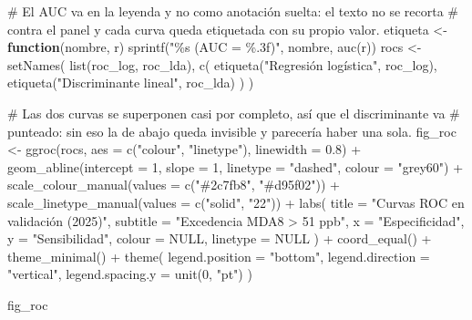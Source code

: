 \documentclass[
  spanish,
  letterpaper,
  DIV=11,
  numbers=noendperiod]{scrartcl}
\newenvironment{Shaded}{\begin{snugshade}}{\end{snugshade}}
\newcommand{\AttributeTok}[1]{\textcolor[rgb]{0.40,0.45,0.13}{#1}}
\newcommand{\CommentTok}[1]{\textcolor[rgb]{0.37,0.37,0.37}{#1}}
\newcommand{\ConstantTok}[1]{\textcolor[rgb]{0.56,0.35,0.01}{#1}}
\newcommand{\ControlFlowTok}[1]{\textcolor[rgb]{0.00,0.23,0.31}{\textbf{#1}}}
\newcommand{\DecValTok}[1]{\textcolor[rgb]{0.68,0.00,0.00}{#1}}
\newcommand{\FloatTok}[1]{\textcolor[rgb]{0.68,0.00,0.00}{#1}}
\newcommand{\FunctionTok}[1]{\textcolor[rgb]{0.28,0.35,0.67}{#1}}
\newcommand{\NormalTok}[1]{\textcolor[rgb]{0.00,0.23,0.31}{#1}}
\newcommand{\OtherTok}[1]{\textcolor[rgb]{0.00,0.23,0.31}{#1}}
\newcommand{\SpecialCharTok}[1]{\textcolor[rgb]{0.37,0.37,0.37}{#1}}
\newcommand{\StringTok}[1]{\textcolor[rgb]{0.13,0.47,0.30}{#1}}
\begin{document}
\begin{Shaded}
\begin{Highlighting}[]
\CommentTok{\# El AUC va en la leyenda y no como anotación suelta: el texto no se recorta}
\CommentTok{\# contra el panel y cada curva queda etiquetada con su propio valor.}
\NormalTok{etiqueta }\OtherTok{\textless{}{-}} \ControlFlowTok{function}\NormalTok{(nombre, r) }\FunctionTok{sprintf}\NormalTok{(}\StringTok{"\%s (AUC = \%.3f)"}\NormalTok{, nombre, }\FunctionTok{auc}\NormalTok{(r))}
\NormalTok{rocs }\OtherTok{\textless{}{-}} \FunctionTok{setNames}\NormalTok{(}
    \FunctionTok{list}\NormalTok{(roc\_log, roc\_lda),}
    \FunctionTok{c}\NormalTok{(}
        \FunctionTok{etiqueta}\NormalTok{(}\StringTok{"Regresión logística"}\NormalTok{, roc\_log),}
        \FunctionTok{etiqueta}\NormalTok{(}\StringTok{"Discriminante lineal"}\NormalTok{, roc\_lda)}
\NormalTok{    )}
\NormalTok{)}

\CommentTok{\# Las dos curvas se superponen casi por completo, así que el discriminante va}
\CommentTok{\# punteado: sin eso la de abajo queda invisible y parecería haber una sola.}
\NormalTok{fig\_roc }\OtherTok{\textless{}{-}} \FunctionTok{ggroc}\NormalTok{(rocs, }\AttributeTok{aes =} \FunctionTok{c}\NormalTok{(}\StringTok{"colour"}\NormalTok{, }\StringTok{"linetype"}\NormalTok{), }\AttributeTok{linewidth =} \FloatTok{0.8}\NormalTok{) }\SpecialCharTok{+}
    \FunctionTok{geom\_abline}\NormalTok{(}\AttributeTok{intercept =} \DecValTok{1}\NormalTok{, }\AttributeTok{slope =} \DecValTok{1}\NormalTok{, }\AttributeTok{linetype =} \StringTok{"dashed"}\NormalTok{, }\AttributeTok{colour =} \StringTok{"grey60"}\NormalTok{) }\SpecialCharTok{+}
    \FunctionTok{scale\_colour\_manual}\NormalTok{(}\AttributeTok{values =} \FunctionTok{c}\NormalTok{(}\StringTok{"\#2c7fb8"}\NormalTok{, }\StringTok{"\#d95f02"}\NormalTok{)) }\SpecialCharTok{+}
    \FunctionTok{scale\_linetype\_manual}\NormalTok{(}\AttributeTok{values =} \FunctionTok{c}\NormalTok{(}\StringTok{"solid"}\NormalTok{, }\StringTok{"22"}\NormalTok{)) }\SpecialCharTok{+}
    \FunctionTok{labs}\NormalTok{(}
        \AttributeTok{title =} \StringTok{"Curvas ROC en validación (2025)"}\NormalTok{,}
        \AttributeTok{subtitle =} \StringTok{"Excedencia MDA8 \textgreater{} 51 ppb"}\NormalTok{,}
        \AttributeTok{x =} \StringTok{"Especificidad"}\NormalTok{, }\AttributeTok{y =} \StringTok{"Sensibilidad"}\NormalTok{,}
        \AttributeTok{colour =} \ConstantTok{NULL}\NormalTok{, }\AttributeTok{linetype =} \ConstantTok{NULL}
\NormalTok{    ) }\SpecialCharTok{+}
    \FunctionTok{coord\_equal}\NormalTok{() }\SpecialCharTok{+}
    \FunctionTok{theme\_minimal}\NormalTok{() }\SpecialCharTok{+}
    \FunctionTok{theme}\NormalTok{(}
        \AttributeTok{legend.position =} \StringTok{"bottom"}\NormalTok{, }\AttributeTok{legend.direction =} \StringTok{"vertical"}\NormalTok{,}
        \AttributeTok{legend.spacing.y =} \FunctionTok{unit}\NormalTok{(}\DecValTok{0}\NormalTok{, }\StringTok{"pt"}\NormalTok{)}
\NormalTok{    )}

\NormalTok{fig\_roc}
\end{Highlighting}
\end{Shaded}
\end{document}
